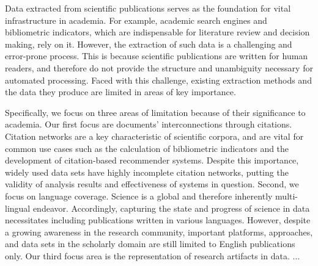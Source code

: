 \Abstract{}
Data extracted from scientific publications serves as the foundation for vital infrastructure in academia.
For example, academic search engines and bibliometric indicators, which are indispensable for literature review and decision making, %
rely on it.
However, the extraction of such data is a challenging and error-prone process.
This is because scientific publications are written for human readers, and therefore do not provide the structure and unambiguity necessary for automated processing. Faced with this challenge, existing extraction methods and the data they produce are limited in areas of key importance.

Specifically, we focus on three areas of limitation because of their significance to academia.
Our first focus are documents' interconnections through citations.
Citation networks are a key characteristic of scientific corpora, and are vital for common use cases such as the calculation of bibliometric indicators and the development of citation-based recommender systems. Despite this importance, widely used data sets have highly incomplete citation networks, putting the validity of analysis results and effectiveness of systems in question.
Second, we focus on language coverage.
Science is a global and therefore inherently multi-lingual endeavor. Accordingly, capturing the state and progress of science in data necessitates including publications written in various languages. However, despite a growing awareness in the
research community, important platforms, approaches, and data sets in the scholarly domain are still limited to English publications only. %
Our third focus area is the representation of research artifacts in data. ...




